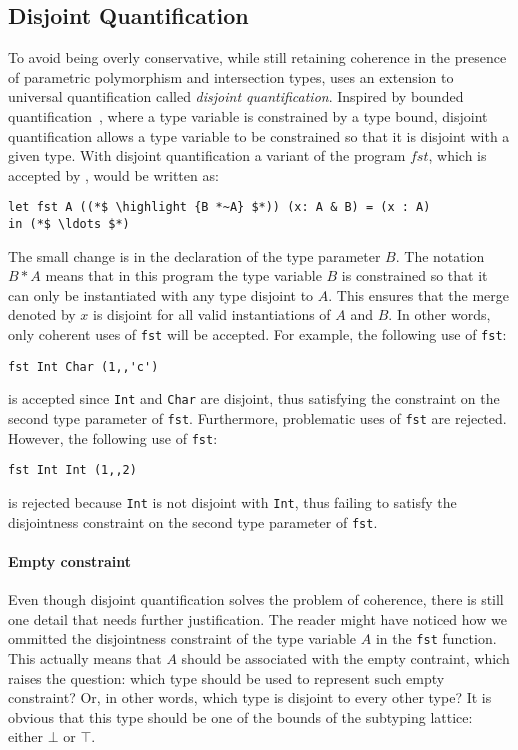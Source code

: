 \subsection{Disjoint Quantification}
To avoid being overly conservative, while still retaining coherence in the
presence of parametric polymorphism and intersection types, \name uses
an extension to universal quantification called \emph{disjoint quantification}.
Inspired by bounded quantification~\cite{Cardelli:1994},
where a type variable is constrained by a type bound, disjoint quantification 
allows a type variable to be constrained so that it is disjoint with a given type. 
With disjoint quantification a variant of the program $fst$, which
is accepted by \name, would be written as:
\begin{lstlisting}
let fst A ((*$ \highlight {B *~A} $*)) (x: A & B) = (x : A)
in (*$ \ldots $*)
\end{lstlisting}
The small change is in the declaration of the type parameter $B$. The notation
$B*A$ means that in this program the type variable $B$ is constrained so that
it can only be instantiated with any type disjoint to $A$.
This ensures that the
merge denoted by $x$ is disjoint for all valid instantiations of $A$ and $B$.
In other words, only coherent uses of \lstinline$fst$ will be accepted.
For example, the following use of \lstinline$fst$:
\begin{lstlisting}
fst Int Char (1,,'c')
\end{lstlisting}
is accepted since \lstinline$Int$ and \lstinline$Char$ are disjoint, thus satisfying the constraint
on the second type parameter of \lstinline$fst$.
Furthermore, problematic uses of \lstinline$fst$ are rejected. 
However, the following use of \lstinline$fst$:
\begin{lstlisting}
fst Int Int (1,,2)
\end{lstlisting}
is rejected because \lstinline$Int$ is not disjoint with \lstinline$Int$, thus failing to satisfy the
disjointness constraint on the second type parameter of \lstinline$fst$.

\paragraph{Empty constraint}
Even though disjoint quantification solves the problem of coherence, there is still one detail 
that needs further justification.
The reader might have noticed how we ommitted the disjointness constraint of 
the type variable $A$ in the \lstinline$fst$ function.
This actually means that $A$ should be associated with the empty contraint,
which raises the question: which type should be used to represent such empty constraint?
Or, in other words, which type is disjoint to every other type? 
It is obvious that this type should be one of the bounds of the subtyping lattice: either $\bot$ or
$\top$.

